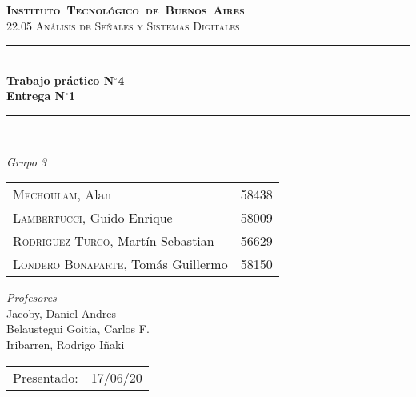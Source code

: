 \begin{titlepage}
\newcommand{\HRule}{\rule{\linewidth}{0.5mm}}
\center
\mbox{\textsc{\LARGE \bfseries {Instituto Tecnológico de Buenos Aires}}}\\[1.5cm]
\textsc{\Large 22.05 Análisis de Señales y Sistemas Digitales}\\[0.5cm]


\HRule \\[0.6cm]
{ \Huge \bfseries Trabajo práctico N$^{\circ}$4}\\[0.4cm]
{ \Large \bfseries Entrega N$^{\circ}$1}\\[0.4cm] 
\HRule \\[1.5cm]


{\large

\emph{Grupo 3}\\
\vspace{3px}

\begin{tabular}{lr} 	
\textsc{Mechoulam}, Alan  &  58438\\
\textsc{Lambertucci}, Guido Enrique  & 58009 \\
\textsc{Rodriguez Turco}, Martín Sebastian  & 56629 \\
\textsc{Londero Bonaparte}, Tomás Guillermo  & 58150 \\
\end{tabular}

\vspace{20px}

\emph{Profesores}\\
Jacoby, Daniel Andres\\
Belaustegui Goitia, Carlos F.\\
Iribarren, Rodrigo Iñaki\\
\vspace{3px}

\vspace{100px}

\begin{tabular}{ll}

Presentado: & 17/06/20\\

\end{tabular}

}

\vfill

\end{titlepage}
